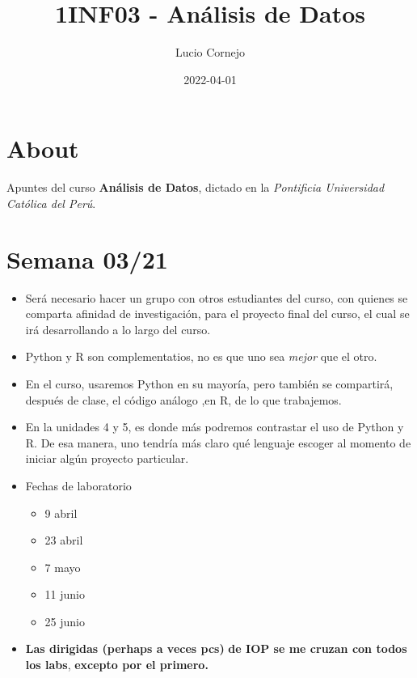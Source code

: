 \documentclass[
]{book}
\title{1INF03 - Análisis de Datos}
\author{Lucio Cornejo}
\date{2022-04-01}
\providecommand{\tightlist}{%
  \setlength{\itemsep}{0pt}\setlength{\parskip}{0pt}}
\begin{document}
\maketitle

{
\setcounter{tocdepth}{1}
\tableofcontents
}
\hypertarget{about}{%
\chapter*{About}\label{about}}

Apuntes del curso \textbf{Análisis de Datos},
dictado en la \emph{Pontificia Universidad Católica del Perú}.

\hypertarget{semana-0321}{%
\chapter{Semana 03/21}\label{semana-0321}}

\begin{itemize}
\item
  Será necesario hacer un grupo con otros
  estudiantes del curso, con quienes se
  comparta afinidad de investigación, para
  el proyecto final del curso, el cual se
  irá desarrollando a lo largo del curso.
\item
  Python y R son complementatios, no
  es que uno sea \emph{mejor} que el otro.
\item
  En el curso, usaremos Python en su mayoría,
  pero también se compartirá, después de clase,
  el código análogo ,en R, de lo que trabajemos.
\item
  En la unidades 4 y 5, es donde más podremos
  contrastar el uso de Python y R. De esa manera,
  uno tendría más claro qué lenguaje escoger al
  momento de iniciar algún proyecto particular.
\item
  Fechas de laboratorio\\

  \begin{itemize}
  \tightlist
  \item
    9 abril
  \item
    23 abril
  \item
    7 mayo
  \item
    11 junio
  \item
    25 junio
  \end{itemize}
\item
  \textbf{Las dirigidas (perhaps a veces pcs)}
  \textbf{de IOP se me cruzan con todos los labs},
  \textbf{excepto por el primero.}
\end{itemize}
\end{document}
